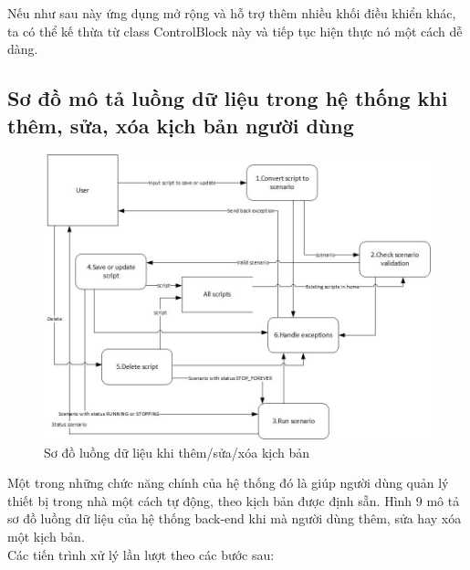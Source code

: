 \documentclass[12pt,a4paper,oneside]{extbook}
\begin{document}
\noindent
Nếu như sau này ứng dụng mở rộng và hỗ trợ thêm nhiều khối điều khiển khác, ta có thể kế thừa từ class ControlBlock này và tiếp tục hiện thực nó một cách dễ dàng.

\subsection{Sơ đồ mô tả luồng dữ liệu trong hệ thống khi thêm, sửa, xóa kịch bản người dùng}

\begin{figure}[h]
  \centering
    \includegraphics[width=15cm]{6-DFD-CRUD-action-with-script}
  \caption{Sơ đồ luồng dữ liệu khi thêm/sửa/xóa kịch bản}\label{fig:6-DFD-CRUD-action-with-script}
\end{figure}

\noindent
Một trong những chức năng chính của hệ thống đó là giúp người dùng quản lý thiết bị trong nhà một cách tự động, theo kịch bản được định sẵn. Hình 9 mô tả sơ đồ luồng dữ liệu của hệ thống back-end khi mà người dùng thêm, sửa hay xóa một kịch bản.\\

\noindent
Các tiến trình xử lý lần lượt theo các bước sau:
\end{document}
